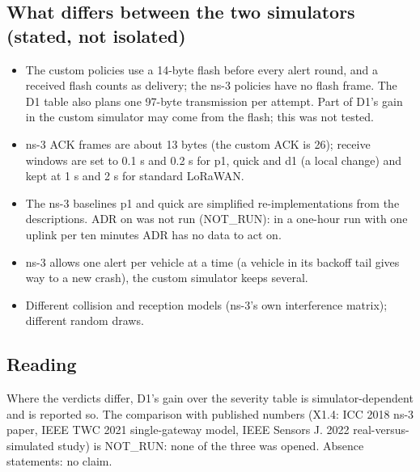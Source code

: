 \subsection*{What differs between the two simulators (stated, not isolated)}
\begin{itemize}
\item The custom policies use a 14-byte flash before every alert round, and a received flash counts as delivery; the ns-3 policies have no flash frame. The D1 table also plans one 97-byte transmission per attempt. Part of D1's gain in the custom simulator may come from the flash; this was not tested.
\item ns-3 ACK frames are about 13 bytes (the custom ACK is 26); receive windows are set to 0.1 s and 0.2 s for p1, quick and d1 (a local change) and kept at 1 s and 2 s for standard LoRaWAN.
\item The ns-3 baselines p1 and quick are simplified re-implementations from the descriptions. ADR on was not run (NOT\_RUN): in a one-hour run with one uplink per ten minutes ADR has no data to act on.
\item ns-3 allows one alert per vehicle at a time (a vehicle in its backoff tail gives way to a new crash), the custom simulator keeps several.
\item Different collision and reception models (ns-3's own interference matrix); different random draws.
\end{itemize}

\subsection*{Reading}

Where the verdicts differ, D1's gain over the severity table is simulator-dependent and is reported so. The comparison with published numbers (X1.4: ICC 2018 ns-3 paper, IEEE TWC 2021 single-gateway model, IEEE Sensors J. 2022 real-versus-simulated study) is NOT\_RUN: none of the three was opened. Absence statements: no claim.

